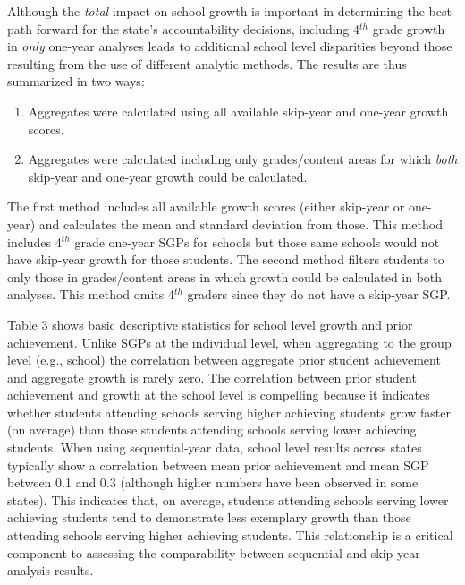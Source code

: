 \documentclass[12pt]{article}
\providecommand{\tightlist}{%
  \setlength{\itemsep}{0pt}\setlength{\parskip}{0pt}}
\begin{document}
Although the \emph{total} impact on school growth is important in
determining the best path forward for the state's accountability
decisions, including 4\(^{th}\) grade growth in \emph{only} one-year
analyses leads to additional school level disparities beyond those
resulting from the use of different analytic methods. The results are
thus summarized in two ways:

\begin{enumerate}
\def\labelenumi{\arabic{enumi}.}
\tightlist
\item
  Aggregates were calculated using all available skip-year and one-year
  growth scores.
\item
  Aggregates were calculated including only grades/content areas for
  which \emph{both} skip-year and one-year growth could be calculated.
\end{enumerate}

\noindent The first method includes all available growth scores (either
skip-year or one-year) and calculates the mean and standard deviation
from those. This method includes 4\(^{th}\) grade one-year SGPs for
schools but those same schools would not have skip-year growth for those
students. The second method filters students to only those in
grades/content areas in which growth could be calculated in both
analyses. This method omits 4\(^{th}\) graders since they do not have a
skip-year SGP.

Table 3 shows basic descriptive statistics for school level growth and
prior achievement. Unlike SGPs at the individual level, when aggregating
to the group level (e.g., school) the correlation between aggregate
prior student achievement and aggregate growth is rarely zero. The
correlation between prior student achievement and growth at the school
level is compelling because it indicates whether students attending
schools serving higher achieving students grow faster (on average) than
those students attending schools serving lower achieving students. When
using sequential-year data, school level results across states typically
show a correlation between mean prior achievement and mean SGP between
0.1 and 0.3 (although higher numbers have been observed in some states).
This indicates that, on average, students attending schools serving
lower achieving students tend to demonstrate less exemplary growth than
those attending schools serving higher achieving students. This
relationship is a critical component to assessing the comparability
between sequential and skip-year analysis results.
\end{document}
